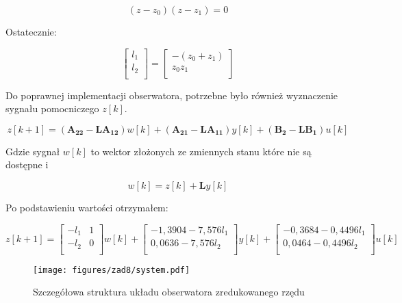 \documentclass[a4paper,titlepage,11pt,floatssmall]{mwrep}
\begin{document}
\begin{equation*}
(z - z_0)(z - z_1) = 0
\end{equation*}

Ostatecznie:

\[ 
\begin{bmatrix}
    l_1 \\
    l_2 \\   
\end{bmatrix}
=
\begin{bmatrix}
    -(z_0 + z_1) \\
    z_0z_1 \\    
\end{bmatrix}
\]

Do poprawnej implementacji obserwatora, potrzebne było również wyznaczenie sygnału pomocniczego $z[k]$.

\begin{equation*}
z[k+1] = (\mathbf{A_{22}} - \mathbf{L}\mathbf{A_{12}})w[k] + (\mathbf{A_{21}} - \mathbf{L}\mathbf{A_{11}})y[k] + (\mathbf{B_{2}} - \mathbf{L}\mathbf{B_{1}})u[k]
\end{equation*}

Gdzie sygnał $w[k]$ to wektor złożonych ze zmiennych stanu które nie są dostępne i 

\begin{equation*}
w[k] = z[k] + \mathbf{L}y[k]
\end{equation*}

Po podstawieniu wartości otrzymałem:

\[ 
z[k+1]
=
\begin{bmatrix}
    -l_1 & 1 \\
    -l_2 & 0 \\    
\end{bmatrix}
w[k] +
\begin{bmatrix}
    -1,3904 - 7,576l_{1} \\
    0,0636 - 7,576l_{2}\\    
\end{bmatrix}
y[k] + 
\begin{bmatrix}
    -0,3684 - 0,4496l_{1} \\
    0,0464 - 0,4496l_{2}\\    
\end{bmatrix}
u[k]
\]

\newpage

\begin{figure}[H]
\centering
\texttt{[image: figures/zad8/system.pdf]}
\caption{Szczegółowa struktura układu obserwatora zredukowanego rzędu}
\end{figure} 
\end{document}
